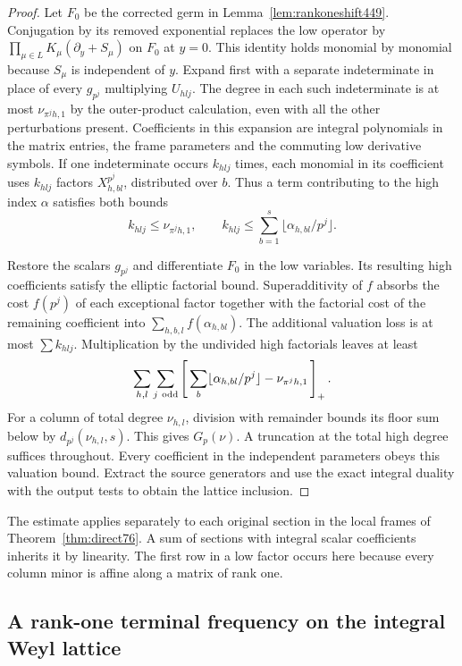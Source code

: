 \documentclass[a4paper,11pt]{article}
\theoremstyle{definition}
\theoremstyle{remark}
\numberwithin{equation}{section}
\begin{document}
\begin{proof}
Let \(F_0\) be the corrected germ in Lemma~\ref{lem:rankoneshift449}.
Conjugation by its removed exponential replaces the low operator
by \(\prod_{\mu\in L}K_\mu(\partial_y+S_\mu)\) on \(F_0\) at
\(y=0\). This identity holds monomial by monomial because
\(S_\mu\) is independent of \(y\). Expand first with a separate
indeterminate in place of every \(g_{p^j}\) multiplying
\(U_{hlj}\). The degree in each such indeterminate is at most
\(\nu_{\pi^jh,1}\) by the outer-product calculation, even with
all the other perturbations present. Coefficients in this
expansion are integral polynomials in the matrix entries, the
frame parameters and the commuting low derivative symbols.
If one indeterminate occurs \(k_{hlj}\) times, each monomial in
its coefficient uses \(k_{hlj}\) factors \(X_{h,bl}^{p^j}\),
distributed over \(b\). Thus a term contributing to the high
index \(\alpha\) satisfies both bounds
\[
 k_{hlj}\le\nu_{\pi^jh,1},\qquad
 k_{hlj}\le\sum_{b=1}^s\lfloor\alpha_{h,bl}/p^j\rfloor .
\]

Restore the scalars \(g_{p^j}\) and differentiate \(F_0\) in
the low variables. Its resulting high coefficients satisfy the
elliptic factorial bound. Superadditivity of \(f\) absorbs the
cost \(f(p^j)\) of each exceptional factor together with the
factorial cost of the remaining coefficient into
\(\sum_{h,b,l} f(\alpha_{h,bl})\). The additional valuation
loss is at most \(\sum k_{hlj}\). Multiplication by the
undivided high factorials leaves at least
\[
 \sum_{h,l}\sum_{j\ {\rm odd}}
 \left[\,\sum_b\lfloor\alpha_{h,bl}/p^j\rfloor-\nu_{\pi^jh,1}\,\right]_+ .
\]
For a column of total degree \(\nu_{h,l}\), division with
remainder bounds its floor sum below by \(d_{p^j}(\nu_{h,l},s)\).
This gives \(G_p(\nu)\). A truncation at the total high degree
suffices throughout. Every coefficient in the independent
parameters obeys this valuation bound. Extract the source
generators and use the exact integral duality with the output
tests to obtain the lattice inclusion.
\end{proof}

The estimate applies separately to each original section in the
local frames of Theorem~\ref{thm:direct76}. A sum of sections with
integral scalar coefficients inherits it by linearity. The first
row in a low factor occurs here because every column minor is
affine along a matrix of rank one.


\subsection{A rank-one terminal frequency on the integral Weyl lattice}
\label{sec:terminalrankonetheta455}
\end{document}
